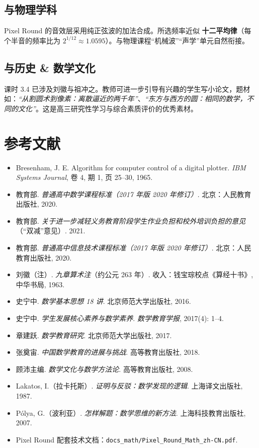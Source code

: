\documentclass[12pt,a4paper]{scrartcl}
\newcommand{\acc}[1]{\textcolor{accent}{\textbf{#1}}}
\begin{document}
\subsection{与物理学科}
Pixel Round 的音效层采用纯正弦波的加法合成。所选频率近似 \acc{十二平均律}（每个半音的频率比为 $2^{1/12} \approx 1.0595$）。与物理课程“机械波”“声学”单元自然衔接。

\subsection{与历史 \& 数学文化}
课时 3.4 已涉及刘徽与祖冲之。教师可进一步引导有兴趣的学生写小论文，题材如：\emph{“从割圆术到像素：离散逼近的两千年”}、\emph{“东方与西方的圆：相同的数学，不同的文化”}。这是高三研究性学习与综合素质评价的优秀素材。

\section{参考文献}

\begin{itemize}[leftmargin=1.3em,itemsep=0.2em,topsep=0.3em]
  \item Bresenham, J. E. Algorithm for computer control of a digital plotter. \emph{IBM Systems Journal}, 卷 4, 期 1, 页 25--30, 1965.
  \item 教育部. \emph{普通高中数学课程标准（2017 年版 2020 年修订）}. 北京：人民教育出版社, 2020.
  \item 教育部. \emph{关于进一步减轻义务教育阶段学生作业负担和校外培训负担的意见}（“双减”意见）. 2021.
  \item 教育部. \emph{普通高中信息技术课程标准（2017 年版 2020 年修订）}. 北京：人民教育出版社, 2020.
  \item 刘徽（注）. \emph{九章算术注}（约公元 263 年）. 收入：钱宝琮校点《算经十书》, 中华书局, 1963.
  \item 史宁中. \emph{数学基本思想 18 讲}. 北京师范大学出版社, 2016.
  \item 史宁中. \emph{学生发展核心素养与数学素养}. \emph{数学教育学报}, 2017(4): 1--4.
  \item 章建跃. \emph{数学教育研究}. 北京师范大学出版社, 2017.
  \item 张奠宙. \emph{中国数学教育的进展与挑战}. 高等教育出版社, 2018.
  \item 顾沛主编. \emph{数学文化与数学方法论}. 高等教育出版社, 2008.
  \item Lakatos, I.（拉卡托斯）. \emph{证明与反驳：数学发现的逻辑}. 上海译文出版社, 1987.
  \item Pólya, G.（波利亚）. \emph{怎样解题：数学思维的新方法}. 上海科技教育出版社, 2007.
  \item Pixel Round 配套技术文档：\texttt{docs\_math/Pixel\_Round\_Math\_zh-CN.pdf}.
\end{itemize}
\end{document}
